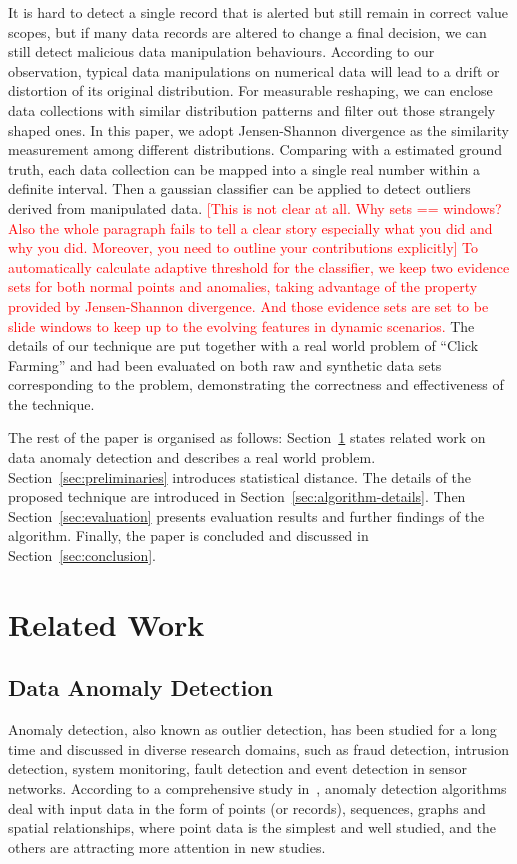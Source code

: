 \documentclass[10pt,conference,letterpaper]{IEEEtran}
\begin{document}
It is hard to detect a single record that is alerted but still remain in correct value scopes, but if many data records are altered to change a final decision, we can still detect malicious data manipulation behaviours.
		According to our observation, typical data manipulations on numerical data will lead to a drift or distortion of its original distribution. For measurable reshaping, we can enclose data collections with similar distribution patterns and filter out those strangely shaped ones. In this paper, we adopt Jensen-Shannon divergence as the similarity measurement among different distributions. Comparing with a estimated ground truth, each data collection can be mapped into a single real number within a definite interval. Then a gaussian classifier can be applied to detect outliers derived from manipulated data. \textcolor{red}{[This is not clear at all. Why sets == windows? Also the whole paragraph fails to tell a clear story especially what you did and why you did. Moreover, you need to outline your contributions explicitly] To automatically calculate adaptive threshold for the classifier, we keep two evidence sets for both normal points and anomalies, taking advantage of the property provided by Jensen-Shannon divergence. And those evidence sets are set to be slide windows to keep up to the evolving features in dynamic scenarios.}
	The details of our technique are put together with a real world problem of ``Click Farming'' and had been evaluated on both raw and synthetic data sets corresponding to the problem, demonstrating the correctness and effectiveness of the technique.
		
		The rest of the paper is organised as follows: Section~\ref{sec:related-work} states related work on data anomaly detection and describes a real world problem. Section~\ref{sec:preliminaries} introduces statistical distance. The details of the proposed technique are introduced in Section~\ref{sec:algorithm-details}. Then Section~\ref{sec:evaluation} presents evaluation results and further findings of the algorithm. Finally, the paper is concluded and discussed in Section~\ref{sec:conclusion}.
		
	\section{Related Work}\label{sec:related-work}
		\subsection{Data Anomaly Detection}
			Anomaly detection, also known as outlier detection, has been studied for a long time and discussed in diverse research domains, such as fraud detection, intrusion detection, system monitoring, fault detection and event detection in sensor networks. According to a comprehensive study in~\cite{chandola2009anomaly}, anomaly detection algorithms deal with input data in the form of points (or records), sequences, graphs and spatial relationships, where point data is the simplest and well studied, and the others are attracting more attention in new studies.
	
\end{document}
